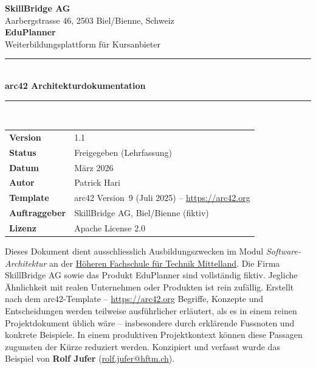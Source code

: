 \documentclass[a4paper,11pt]{article}
\begin{document}

\thispagestyle{empty}
\begin{center}
  \vspace*{3cm}
  {\sffamily\Huge\bfseries\color{darkblue} SkillBridge AG}\\[0.4cm]
  {\sffamily\large\color{grey} Aarbergstrasse 46, 2503 Biel/Bienne, Schweiz}\\[1.2cm]
  {\sffamily\huge\bfseries\color{midblue} EduPlanner}\\[0.3cm]
  {\sffamily\Large\color{grey} Weiterbildungsplattform für Kursanbieter}\\[0.8cm]
  {\color{midblue}\rule{12cm}{1.5pt}}\\[0.4cm]
  {\sffamily\LARGE\bfseries\color{darkblue} arc42 Architekturdokumentation}\\[0.4cm]
  {\color{midblue}\rule{12cm}{1.5pt}}\\[1.5cm]

  \begin{tabular}{L{4cm} L{9cm}}
    \textbf{Version} & 1.1 \\
    \textbf{Status}  & Freigegeben (Lehrfassung) \\
    \textbf{Datum}   & März 2026 \\
    \textbf{Autor}   & Patrick Hari \\
    \textbf{Template} & arc42 Version~9 (Juli 2025) -- \url{https://arc42.org} \\
    \textbf{Auftraggeber} & SkillBridge AG, Biel/Bienne (fiktiv) \\
    \textbf{Lizenz} & Apache License 2.0 \\
  \end{tabular}
\end{center}

\vspace{1.5cm}
\begin{hinweis}
Dieses Dokument dient ausschliesslich Ausbildungszwecken im Modul \emph{Software-Architektur} an der \href{https://www.hftm.ch/de}{Höheren Fachschule für Technik Mittelland}.
Die Firma SkillBridge AG sowie das Produkt EduPlanner sind vollständig fiktiv.
Jegliche Ähnlichkeit mit realen Unternehmen oder Produkten ist rein zufällig.
Erstellt nach dem arc42-Template -- \url{https://arc42.org}
\newline
\newline
Begriffe, Konzepte und Entscheidungen werden
teilweise ausführlicher erläutert, als es in einem reinen
Projektdokument üblich wäre -- insbesondere durch erklärende
Fussnoten und konkrete Beispiele. In einem produktiven
Projektkontext können diese Passagen zugunsten der Kürze
reduziert werden.
\newline
\newline
Konzipiert und verfasst wurde das Beispiel von \textbf{Rolf Jufer}
(\href{mailto:rolf.jufer@hftm.ch}{rolf.jufer@hftm.ch}).
\end{hinweis}
\end{document}
